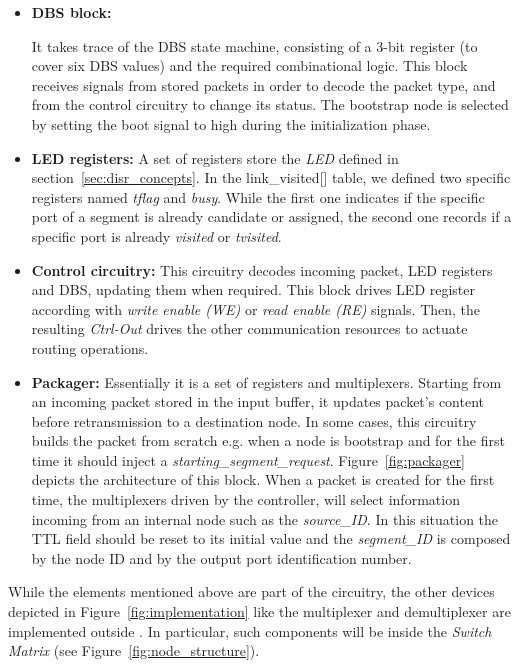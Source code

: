 \begin{itemize}

	\item \textbf{DBS block:}

	It takes trace of the DBS state machine, consisting of a 3-bit
	register (to cover six DBS values) and the  required combinational
	logic. This block receives signals from  stored packets  in order
	to decode the packet type, and from  the control circuitry to
	change its status. The bootstrap node is selected by setting the
	boot signal to high during the initialization phase.

	\item \textbf{LED registers:}
	A set of registers store the \emph{LED} defined in
	section~\ref{sec:disr_concepts}.  In the
	link\_visited[] table, we defined two specific registers named
	\emph{tflag} and \emph{busy}. While the first one indicates
    if the specific port of a segment is already candidate or assigned,
    the second one records if a specific port is already \emph{visited} or \emph{tvisited}.

    \item \textbf{Control circuitry:}
    This circuitry decodes incoming packet, LED
	registers and DBS, updating them when required. This block
	drives LED register according with \emph{write enable (WE)} or \emph{read enable (RE)}
	signals. Then, the resulting \emph{Ctrl-Out} drives the other
	communication resources to actuate \disr{} routing operations.

	\item \textbf{Packager:}
	Essentially it is a set of registers and multiplexers. Starting from
	an incoming packet stored in the input buffer, it updates packet's
	content before retransmission to a destination
	node.  In some cases, this circuitry builds the packet from
	scratch e.g. when a node is bootstrap and for
	the first time it should inject a \emph{starting\_segment\_request}. 
	Figure~\ref{fig:packager} depicts the architecture of this
	block. When a packet is created for the first time, the multiplexers 
	driven by the controller, will select information incoming from an internal 
    node such as the \emph{source\_ID}. In this situation the 
	TTL field should be reset to its initial value and the \emph{segment\_ID}
	is composed by the node ID and by the output port identification 
	number.

\end{itemize}

While the elements mentioned above are part of the \disr{} circuitry,
the other devices depicted in Figure~\ref{fig:implementation} like the
multiplexer and demultiplexer are implemented outside \disr{}. In
particular, such components will be inside the \emph{Switch Matrix} (see Figure~\ref{fig:node_structure}).

